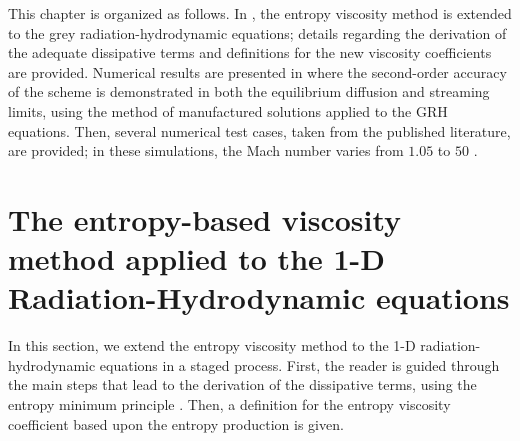 This chapter is organized as follows. In , the entropy viscosity method is extended to the grey radiation-hydrodynamic equations;  details regarding the derivation of the adequate dissipative terms and definitions for the new viscosity coefficients are provided. Numerical results are presented in  where the second-order accuracy of the scheme is demonstrated in both the equilibrium diffusion and streaming limits, using the method of manufactured solutions applied to the GRH equations. Then, several numerical test cases, taken from the published literature, are provided; in these simulations, the Mach number varies from $1.05$ to $50$ \cite{LowrieEdwards}.

\section{The entropy-based viscosity method applied to the 1-D Radiation-Hydrodynamic equations}\label{sec:entropy-visc-meth_sct5}

In this section, we extend the entropy viscosity method \cite{jlg1, jlg2, valentin} to the 1-D radiation-hydrodynamic equations in a staged process. First, the reader is guided through the main steps that lead to the derivation of the dissipative terms, using the entropy minimum principle \cite{entropy}. Then, a definition for the entropy viscosity coefficient based upon the entropy production is given. 

